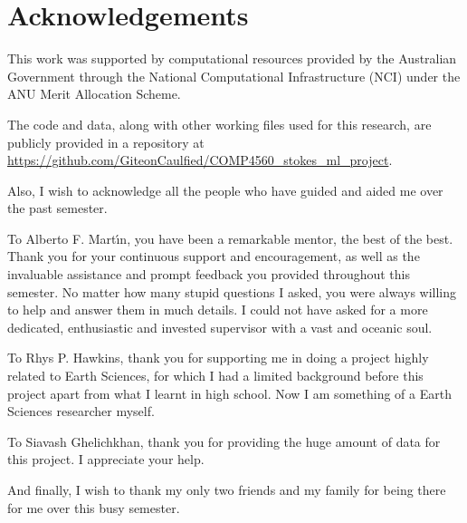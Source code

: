 \chapter*{Acknowledgements}

This work was supported by computational resources provided by the Australian Government through the National Computational Infrastructure (NCI) under the ANU Merit Allocation Scheme.

The code and data, along with other working files used for this research, are publicly provided in a repository at \url{https://github.com/GiteonCaulfied/COMP4560_stokes_ml_project}.

Also, I wish to acknowledge all the people who have guided and aided me over the past semester.

To Alberto F. Mart\'{\i}n, you have been a remarkable mentor, the best of the best. Thank you for your continuous support and encouragement, as well as the invaluable assistance and prompt feedback you provided throughout this semester. No matter how many stupid questions I asked, you were always willing to help and answer them in much details. I could not have asked for a more dedicated, enthusiastic and invested supervisor with a vast and oceanic soul.

To Rhys P. Hawkins, thank you for supporting me in doing a project highly related to Earth Sciences, for 
which I had a limited background before this project apart from what I learnt in high school. Now I am something of a Earth Sciences researcher myself.

To Siavash Ghelichkhan, thank you for providing the huge amount of data for this project. I appreciate your help.

And finally, I wish to thank my only two friends and my family for being there for me over this busy semester.


